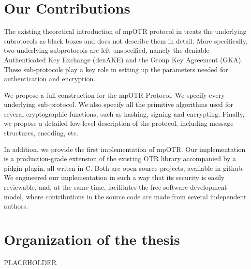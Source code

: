 \section{Our Contributions}
The existing theoretical introduction of mpOTR protocol in \cite{mpotr} treats the underlying subrotocols as black boxes and does not describe them in detail. More specifically, two underlying subprotocols are left unspecified, namely the deniable Authenticated Key Exchange (denAKE) and the Group Key Agreement (GKA). These sub-protocols play a key role in setting up the parameters needed for authentication and encryption.

We propose a full construction for the mpOTR Protocol. We specify every underlying sub-protocol. We also specify all the primitive algorithms used for several cryptographic functions, such as hashing, signing and encrypting. Finally, we propose a detailed low-level description of the protocol, including message structures, encoding, etc.

In addition, we provide the first implementation of mpOTR. Our implementation is a production-grade extension of the existing OTR library accompanied by a pidgin plugin, all writen in C. Both are open source projects, available in github. We engineered our implementation in such a way that its security is easily reviewable, and, at the same time, facilitates the free software development model, where contributions in the source code are made from several independent authors.

\section{Organization of the thesis}
PLACEHOLDER